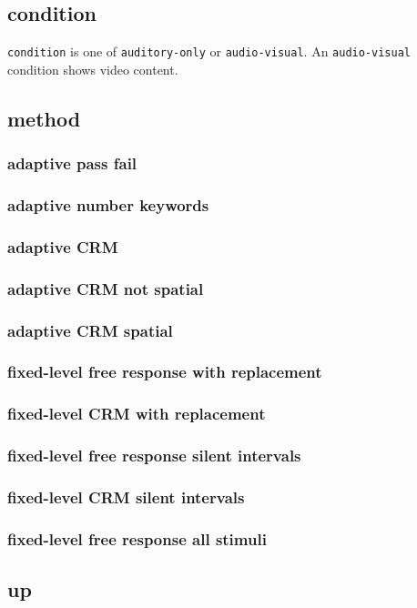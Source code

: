 \documentclass[11pt,pdftex,letterpaper]{article}
\begin{document}
\subsection{condition}
\texttt{condition} is one of \texttt{auditory-only} or \texttt{audio-visual}. An \texttt{audio-visual} condition shows video content.
\subsection{method}
\subsubsection{adaptive pass fail}
\subsubsection{adaptive number keywords}
\subsubsection{adaptive CRM}
\subsubsection{adaptive CRM not spatial}
\subsubsection{adaptive CRM spatial}
\subsubsection{fixed-level free response with replacement}
\subsubsection{fixed-level CRM with replacement}
\subsubsection{fixed-level free response silent intervals}
\subsubsection{fixed-level CRM silent intervals}
\subsubsection{fixed-level free response all stimuli}
\subsection{up}
\end{document}
